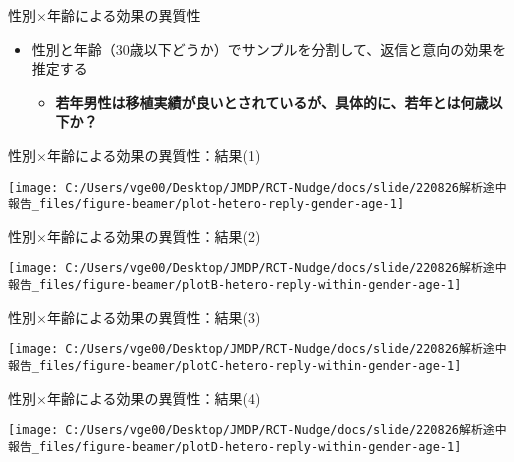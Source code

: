 \documentclass[
      aspectratio=169,
        12pt,
    ]{beamer}
\renewcommand{\textbf}[1]{{\color{DarkBlue}\bfseries#1}}
\providecommand{\tightlist}{%
  \setlength{\itemsep}{0pt}\setlength{\parskip}{0pt}}
\begin{document}
\begin{frame}{性別×年齢による効果の異質性}
\protect\hypertarget{ux6027ux5225ux5e74ux9f62ux306bux3088ux308bux52b9ux679cux306eux7570ux8ceaux6027}{}
\begin{itemize}
\tightlist
\item
  性別と年齢（30歳以下どうか）でサンプルを分割して、返信と意向の効果を推定する

  \begin{itemize}
  \tightlist
  \item
    \textbf{若年男性は移植実績が良いとされているが、具体的に、若年とは何歳以下か？}
  \end{itemize}
\end{itemize}
\end{frame}

\begin{frame}{性別×年齢による効果の異質性：結果(1)}
\protect\hypertarget{ux6027ux5225ux5e74ux9f62ux306bux3088ux308bux52b9ux679cux306eux7570ux8ceaux6027ux7d50ux679c1}{}
\begin{center}\texttt{[image: C:/Users/vge00/Desktop/JMDP/RCT-Nudge/docs/slide/220826解析途中報告\_files/figure-beamer/plot-hetero-reply-gender-age-1]} \end{center}
\end{frame}

\begin{frame}{性別×年齢による効果の異質性：結果(2)}
\protect\hypertarget{ux6027ux5225ux5e74ux9f62ux306bux3088ux308bux52b9ux679cux306eux7570ux8ceaux6027ux7d50ux679c2}{}
\begin{center}\texttt{[image: C:/Users/vge00/Desktop/JMDP/RCT-Nudge/docs/slide/220826解析途中報告\_files/figure-beamer/plotB-hetero-reply-within-gender-age-1]} \end{center}
\end{frame}

\begin{frame}{性別×年齢による効果の異質性：結果(3)}
\protect\hypertarget{ux6027ux5225ux5e74ux9f62ux306bux3088ux308bux52b9ux679cux306eux7570ux8ceaux6027ux7d50ux679c3}{}
\begin{center}\texttt{[image: C:/Users/vge00/Desktop/JMDP/RCT-Nudge/docs/slide/220826解析途中報告\_files/figure-beamer/plotC-hetero-reply-within-gender-age-1]} \end{center}
\end{frame}

\begin{frame}{性別×年齢による効果の異質性：結果(4)}
\protect\hypertarget{ux6027ux5225ux5e74ux9f62ux306bux3088ux308bux52b9ux679cux306eux7570ux8ceaux6027ux7d50ux679c4}{}
\begin{center}\texttt{[image: C:/Users/vge00/Desktop/JMDP/RCT-Nudge/docs/slide/220826解析途中報告\_files/figure-beamer/plotD-hetero-reply-within-gender-age-1]} \end{center}
\end{frame}
\end{document}
